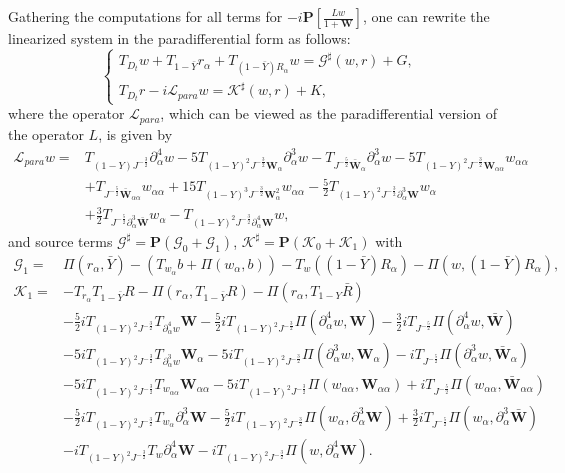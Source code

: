 \documentclass[10pt]{amsart}
\theoremstyle{remark}
\theoremstyle{definition}
\numberwithin{equation}{section}
\newcommand{\p}{\partial}
\newcommand{\al}{\alpha}
\newcommand{\f}{\frac}
\newcommand{\bw}{\mathbf{W}}
\newcommand{\nP}{{\mathbf P}}
\begin{document}
Gathering the computations for all terms for $-i\nP\left[\f{Lw}{1+\mathbf{W}}\right]$, one can rewrite the linearized system in the
paradifferential form as follows:
\begin{equation} \label{ParadifferentialLinearEqn}
\begin{cases}
T_{D_t}w+T_{1-\bar{Y}}r_{\al}+T_{(1-\bar{Y})R_{\al}}w=\mathcal{G}^{\sharp}(w,r)+G,\\
T_{D_t}r-i\mathcal{L}_{para}w=\mathcal{K}^{\sharp}(w,r)+K,
\end{cases}
\end{equation}
where the operator $\mathcal{L}_{para}$, which can be viewed as the paradifferential version of the operator $L$, is given by
\begin{equation} \label{LLinDef}
\begin{split}
\mathcal{L}_{para}w=&T_{(1-Y)J^{-\f32}}\p_{\al}^4w-5T_{(1-Y)^2J^{-\f32}\mathbf{W}_{\al}}\p_{\al}^3w-T_{J^{-\f52}\bar{\bw}_{\al}}\p_{\al}^3w -5T_{(1-Y)^2J^{-\f32}\mathbf{W}_{\al\al}}w_{\al\al}
\\
&+T_{J^{-\f52}\bar{\mathbf{W}}_{\al\al}}w_{\al\al}+15T_{(1-Y)^3J^{-\f32}\mathbf{W}^2_{\al}}w_{\al\al} -\f52T_{(1-Y)^2J^{-\f32}\p^3_{\al}\mathbf{W}}w_{\al}\\
&+\f32T_{J^{-\f52}\p^3_{\al}\bar{\mathbf{W}}}w_{\al}-T_{(1-Y)^2J^{-\f32}\p^4_{\al}\mathbf{W}}w,   
\end{split}
\end{equation}
and source terms $\mathcal{G}^{\sharp}=\nP(\mathcal{G}_0+\mathcal{G}_1)$, $\mathcal{K}^{\sharp}=\nP(\mathcal{K}_0+\mathcal{K}_1)$ with
\begin{equation*}
\begin{aligned}
\mathcal{G}_1=&\Pi(r_{\al},\bar{Y})-(T_{w_{\al}}b+\Pi(w_{\al},b))-T_{w}((1-\bar{Y})R_{\al})-\Pi(w,(1-\bar{Y})R_{\al}),\\
\mathcal{K}_1
=&-T_{r_{\al}}T_{1-\bar{Y}}R-\Pi(r_{\al},T_{1-\bar{Y}}R)-\Pi(r_{\al},T_{1-Y}\bar{R})\\
&-\f52iT_{(1-Y)^2J^{-\f32}}T_{\p_{\al}^4w} \bw-\f52iT_{(1-Y)^2J^{-\f32}}\Pi(\p_{\al}^4w, \bw)  -\f32i  T_{J^{-\f52}} \Pi(\p^4_{\al}w,\bar{\bw})\\
&-5iT_{(1-Y)^2J^{-\f32}}T_{\p_{\al}^3w}\mathbf{W}_{\al} 
-5iT_{(1-Y)^2J^{-\f32}}\Pi(\p^3_{\al}w,\mathbf{W}_{\al})
-iT_{J^{-\f52}}\Pi(\p^3_{\al}w,\bar{\bw}_{\al}) \\
&-5iT_{(1-Y)^2J^{-\f32}}T_{w_{\al\al}} \mathbf{W}_{\al\al}-5iT_{(1-Y)^2J^{-\f32}}\Pi(w_{\al\al},\mathbf{W}_{\al\al})+iT_{J^{-\f52}}\Pi(w_{\al\al},\bar{\mathbf{W}}_{\al\al})\\
&-\f52iT_{(1-Y)^2J^{-\f32}}T_{w_{\al}}\p^3_{\al}\mathbf{W}-\f52i T_{(1-Y)^2J^{-\f32}}\Pi(w_{\al},\p^3_{\al}\mathbf{W}) +\f32iT_{J^{-\f52}}\Pi(w_{\al},\p^3_{\al}\bar{\mathbf{W}})\\
&-iT_{(1-Y)^2J^{-\f32}}T_{w}\p^4_{\al}\mathbf{W}-iT_{(1-Y)^2J^{-\f32}}\Pi(w,\p^4_{\al}\mathbf{W}).
\end{aligned}
\end{equation*}
\end{document}
